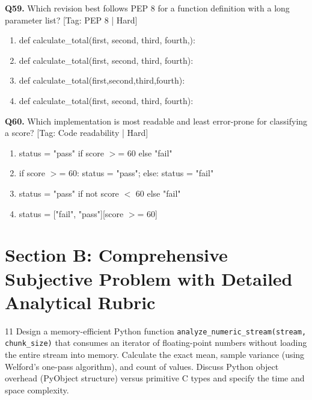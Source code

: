 \vspace{2mm}
\noindent\textbf{Q59.} Which revision best follows PEP 8 for a function definition with a long parameter list? \hfill [Tag: PEP 8 | Hard]
\begin{enumerate}[label=(\alph*),topsep=2pt,itemsep=1pt,partopsep=0pt,parsep=0pt]
    \item {def calculate\_total(first, second, third, fourth,):}
    \item {def calculate\_total(first, second, third, fourth):}
    \item {def calculate\_total(first,second,third,fourth):}
    \item {def calculate\_total(first, second, third, fourth):}
\end{enumerate}
\vspace{2mm}
\noindent\textbf{Q60.} Which implementation is most readable and least error-prone for classifying a score? \hfill [Tag: Code readability | Hard]
\begin{enumerate}[label=(\alph*),topsep=2pt,itemsep=1pt,partopsep=0pt,parsep=0pt]
    \item {status = "pass" if score $>$= 60 else "fail"}
    \item {if score $>$= 60: status = "pass"; else: status = "fail"}
    \item {status = "pass" if not score $<$ 60 else "fail"}
    \item {status = ["fail", "pass"][score $>$= 60]}
\end{enumerate}
\vspace{2mm}

\section{Section B: Comprehensive Subjective Problem with Detailed Analytical Rubric}

\begin{subjectiveq}{1}{1}
Design a memory-efficient Python function \texttt{analyze\_numeric\_stream(stream, chunk\_size)} that consumes an iterator of floating-point numbers without loading the entire stream into memory. Calculate the exact mean, sample variance (using Welford's one-pass algorithm), and count of values. Discuss Python object overhead (PyObject structure) versus primitive C types and specify the time and space complexity.
\end{subjectiveq}

